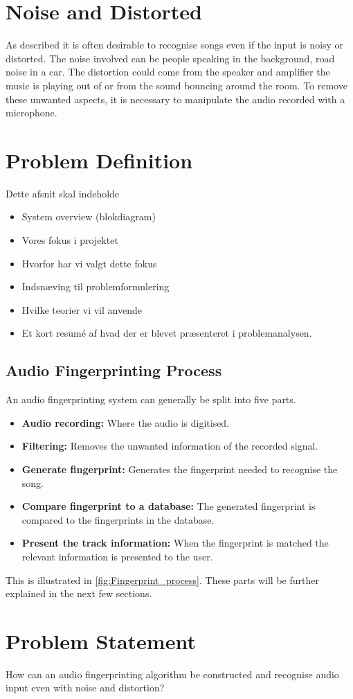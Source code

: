 \section{Noise and Distorted}
As described it is often desirable to recognise songs even if the input is noisy or distorted. The noise involved can be people speaking in the background, road noise in a car. The distortion could come from the speaker and amplifier the music is playing out of or from the sound bouncing around the room. To remove these unwanted aspects, it is necessary to manipulate the audio recorded with a microphone.\cite{haitsma2003highly}\\




\section{Problem Definition}
Dette afsnit skal indeholde
\begin{itemize}
    \item System overview (blokdiagram)
    \item Vores fokus i projektet
    \item Hvorfor har vi valgt dette fokus
    \item Indsnæving til problemformulering
    \item Hvilke teorier vi vil anvende
    \item Et kort resumé af hvad der er blevet præsenteret i problemanalysen. 
\end{itemize}
\subsection{Audio Fingerprinting Process}
An audio fingerprinting system can generally be split into five parts.
\begin{itemize}
    \item \textbf{Audio recording:} Where the audio is digitised.
    \item \textbf{Filtering:} Removes the unwanted information of the recorded signal.
    \item \textbf{Generate fingerprint:} Generates the fingerprint needed to recognise the song.
    \item \textbf{Compare fingerprint to a database:} The generated fingerprint is compared to the fingerprints in the database.
    \item \textbf{Present the track information:} When the fingerprint is matched the relevant information is presented to the user.
\end{itemize}
This is illustrated in \autoref{fig:Fingerprint_process}.
These parts will be further explained in the next few sections.
   


\section{Problem Statement}
How can an audio fingerprinting algorithm be constructed and recognise audio input even with noise and distortion? 
